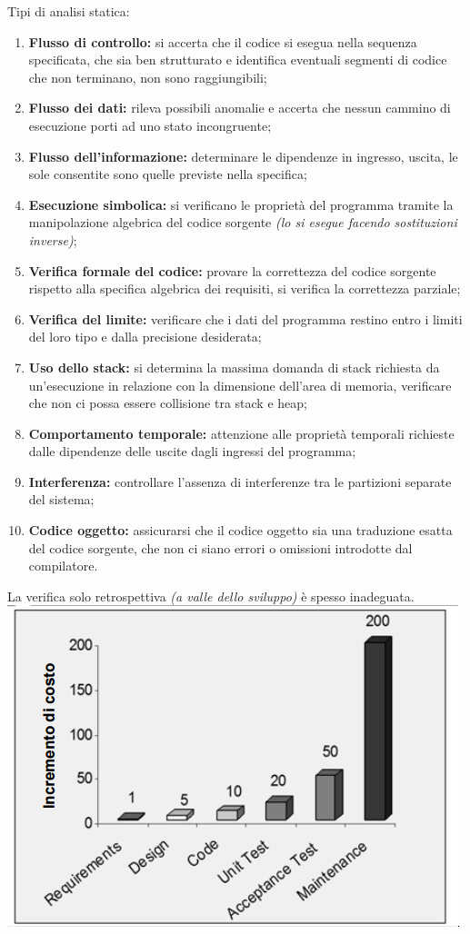 Tipi di analisi statica:
\begin{enumerate}
	\item \textbf{Flusso di controllo:} si accerta che il codice si esegua nella sequenza specificata, che sia ben strutturato e identifica eventuali segmenti di codice che non terminano, non sono raggiungibili;
	\item \textbf{Flusso dei dati:} rileva possibili anomalie e accerta che nessun cammino di esecuzione porti ad uno stato incongruente;
	\item \textbf{Flusso dell'informazione:} determinare le dipendenze in ingresso, uscita, le sole consentite sono quelle previste nella specifica;
	\item \textbf{Esecuzione simbolica:} si verificano le proprietà del programma tramite la manipolazione algebrica del codice sorgente \textit{(lo si esegue facendo sostituzioni inverse)};
	\item \textbf{Verifica formale del codice:} provare la correttezza del codice sorgente rispetto alla specifica algebrica dei requisiti, si verifica la correttezza parziale;
	\item \textbf{Verifica del limite:} verificare che i dati del programma restino entro i limiti del loro tipo e dalla precisione desiderata;
	\item \textbf{Uso dello stack:} si determina la massima domanda di stack richiesta da un'esecuzione in relazione con la dimensione dell'area di memoria, verificare che non ci possa essere collisione tra stack e heap;
	\item \textbf{Comportamento temporale:} attenzione alle proprietà temporali richieste dalle dipendenze delle uscite dagli ingressi del programma;
	\item \textbf{Interferenza:} controllare l'assenza di interferenze tra le partizioni separate del sistema;
	\item \textbf{Codice oggetto:} assicurarsi che il codice oggetto sia una traduzione esatta del codice sorgente, che non ci siano errori o omissioni introdotte dal compilatore.
\end{enumerate}
La verifica solo retrospettiva \textit{(a valle dello sviluppo)} è spesso inadeguata.\\
\includegraphics[width=0.5\columnwidth]{img5} %

